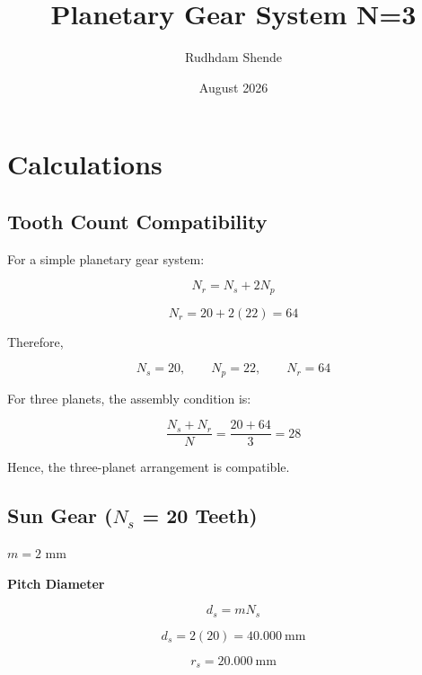 \documentclass{article}
\title{Planetary Gear System N=3}
\author{Rudhdam Shende}
\date{August 2026}
\begin{document}
\maketitle

\section{Calculations}

\subsection{\textbf{Tooth Count Compatibility}}

For a simple planetary gear system:

\begin{equation}
N_r = N_s + 2N_p
\end{equation}

\begin{equation}
N_r = 20 + 2(22) = 64
\end{equation}

Therefore,

\begin{equation}
N_s = 20,\qquad N_p = 22,\qquad N_r = 64
\end{equation}

For three planets, the assembly condition is:

\begin{equation}
\frac{N_s+N_r}{N}
=
\frac{20+64}{3}
=
28
\end{equation}

Hence, the three-planet arrangement is compatible.

\subsection{\textbf{Sun Gear ($N_s$ = 20 Teeth)}}

$m = 2$ mm

\textbf{Pitch Diameter}

\begin{equation}
d_s = mN_s
\end{equation}

\begin{equation}
d_s = 2(20) = 40.000\ \mathrm{mm}
\end{equation}

\begin{equation}
r_s = 20.000\ \mathrm{mm}
\end{equation}
\end{document}
